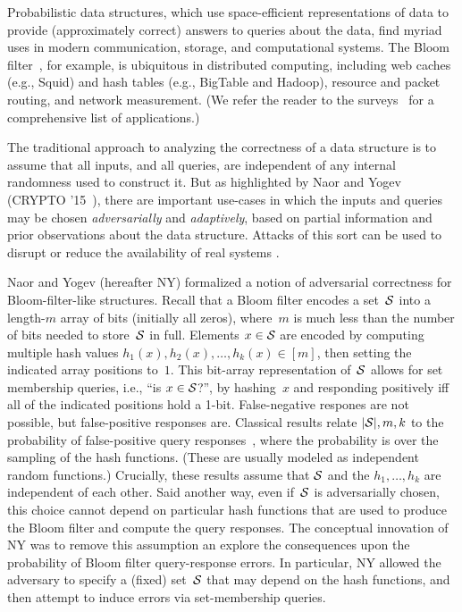 Probabilistic data structures, which use space-efficient
representations of data to provide (approximately correct) answers to
queries about the data, find myriad uses in modern communication,
storage, and computational systems.  The Bloom
filter~\cite{bloom1970space}, for example, is
ubiquitous in distributed computing, including web caches (e.g., Squid) and hash
tables (e.g., BigTable and Hadoop), resource and packet routing, and network
measurement. (We refer the reader to the
surveys~\cite{broder2004network,tarkoma2012theory} for a comprehensive list of
applications.) 

The traditional approach to analyzing the correctness of a data structure is to
assume that all inputs, and all queries, are independent of any internal
randomness used to construct it.  But as highlighted by Naor and
Yogev (CRYPTO '15~\cite{naor2015bloom}), there are important use-cases in which the inputs
and queries may be chosen \emph{adversarially} and \emph{adaptively}, based on
partial information and prior observations about the data structure. Attacks of
this sort can be used to disrupt or reduce the availability of real systems
\cite{crosby2003denial,gerbet2015power,lipton1993clocked}.

Naor and Yogev (hereafter NY) formalized a notion of adversarial correctness for 
Bloom-filter-like structures.  Recall that a Bloom filter encodes a
set~$\mathcal{S}$ into a length-$m$ array of bits (initially all zeros), where~$m$ is much less than the
number of bits needed to store~$\mathcal{S}$ in full.  Elements $x \in \mathcal{S}$
are encoded by computing multiple hash values
$h_1(x),h_2(x),\ldots,h_k(x)\in [m]$, then setting the indicated array positions
to~$1$.  This bit-array representation of~$\mathcal{S}$ allows for
set membership queries, i.e., ``is $x\in\mathcal{S}$?'', 
by hashing~$x$ and responding positively iff all of the indicated
positions hold a 1-bit. 
False-negative respones are not possible, but false-positive responses
are.  Classical results relate $|\mathcal{S}|,m,k$ to the probability of false-positive query
responses~\cite{broder2004network,kirsch2006less}, where the
probability is over the sampling of the hash functions.  (These are
usually modeled as independent random functions.)  
Crucially, these results assume that $\mathcal{S}$ and the $h_1,\ldots,h_k$ are independent of
each other.  Said another way, even if~$\mathcal{S}$ is adversarially chosen,
this choice cannot depend on particular hash functions that are used
to produce the Bloom filter and compute the query responses.
%
The conceptual innovation of NY was to remove this assumption an explore the
consequences upon the probability of Bloom filter query-response errors.  In
particular, NY allowed the adversary to specify a (fixed) set~$\mathcal{S}$ that may
depend on the hash functions, and then attempt to induce errors via
set-membership queries.

